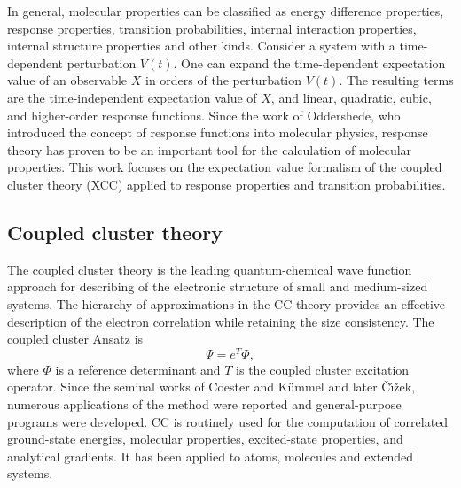 \documentclass[preprint,12pt]{elsarticle}
\newcommand{\equl}[2]{\begin{equation}\label{#2} #1 \end{equation}}
\begin{document}
In general, molecular properties can be classified as 
energy difference properties, response properties,
transition probabilities, internal interaction properties, internal structure properties and other kinds.\cite{pickup1992theory} 
Consider a system with a time-dependent perturbation $V(t)$. One can expand the 
time-dependent expectation value of an observable $X$ in orders of the perturbation $V(t)$. 
The resulting terms are the time-independent expectation value of $X$,  and linear, quadratic, cubic, and higher-order response functions.
Since the work of Oddershede,\cite{oddershede1978polarization, oddershede1984polarization, oddershede1987propagator}
who introduced the concept of response functions into molecular physics, 
 response theory has proven to be an  important tool for the calculation of 
molecular properties.\cite{linderberg2004propagators, jorgensen2012second, oddershede1987propagator}
This work focuses on  the
expectation value formalism of the coupled cluster theory (XCC) 
applied to  response properties and transition probabilities.


\subsection{Coupled cluster theory}
The coupled cluster theory\cite{coester1958bound, coester1960short, vcivzek1966correlation, cizek1969use} 
is the leading quantum-chemical wave function approach for 
 describing of the electronic structure of small and medium-sized systems.
The hierarchy of approximations in the CC theory provides an effective description
of the electron correlation while retaining the size consistency.\cite{dykstra2011theory}
The coupled cluster Ansatz is 
\equl{\Psi = e^T \Phi,}{ansatz}
where $\Phi$ is a reference determinant and $T$ is the coupled cluster excitation operator. 
Since the seminal works of Coester and Kümmel\cite{coester1958bound, coester1960short} and later \v{C}\'{\i}\v{z}ek, \cite{vcivzek1966correlation} numerous applications of the method were reported\cite{paldus1972correlation} and general-purpose programs\cite{pople1978electron, purvis1982full} were developed.  
CC is routinely used for the computation of correlated ground-state energies, \cite{bartlett2007coupled}
molecular properties,
\cite{koch1997coupled, korona2006time, korona2006one}
excited-state properties,\cite{krylov2008equation}
and analytical gradients.\cite{adamowicz1984analytical} It has been applied to atoms,
molecules and extended systems.\cite{hirata2001highly, hirata2004coupled, mihaila2000ground, kowalski2004coupled}
\end{document}
